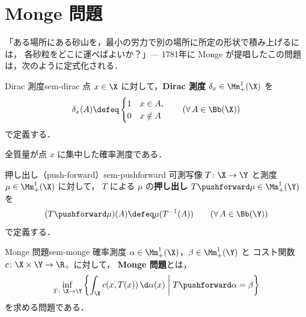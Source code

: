 \section{Monge 問題}
\label{sec:sem-monge}

「ある場所にある砂山を，最小の労力で別の場所に所定の形状で積み上げるには，
各砂粒をどこに運べばよいか？」---
1781年に Monge が提唱したこの問題は，次のように定式化される．

\begin{definition}{Dirac 測度}{sem-dirac}
  点 $x \in \X$ に対して，\textbf{Dirac 測度} $\delta_x \in \Mm_+^1(\X)$ を
  \[
    \delta_x(A) \defeq
    \begin{cases}
      1 & x \in A, \\
      0 & x \notin A
    \end{cases}
    \qquad (\forall\, A \in \Bb(\X))
  \]
  で定義する．
\end{definition}

全質量が点 $x$ に集中した確率測度である．

\begin{definition}{押し出し（push-forward）}{sem-pushforward}
  可測写像 $T \colon \X \to \Y$ と測度 $\mu \in \Mm_+^1(\X)$ に対して，
  $T$ による $\mu$ の\textbf{押し出し} $T\pushforward \mu \in \Mm_+^1(\Y)$ を
  \[
    (T\pushforward \mu)(A) \defeq \mu(T^{-1}(A))
    \qquad (\forall\, A \in \Bb(\Y))
  \]
  で定義する．
\end{definition}

\begin{definition}{Monge 問題}{sem-monge}
  確率測度 $\alpha \in \Mm_+^1(\X)$，$\beta \in \Mm_+^1(\Y)$ と
  コスト関数 $c \colon \X \times \Y \to \R_+$ に対して，
  \textbf{Monge 問題}とは，
  \[
    \inf_{T \colon \X \to \Y}
    \left\{
    \int_{\X} c(x, T(x)) \, \d\alpha(x)
    \;\middle|\;
    T\pushforward \alpha = \beta
    \right\}
  \]
  を求める問題である．
\end{definition}


